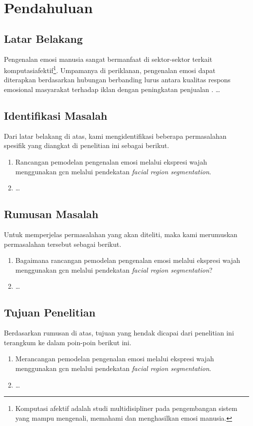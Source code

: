 \chapter{Pendahuluan}

\section{Latar Belakang}
Pengenalan emosi manusia sangat bermanfaat di sektor-sektor terkait \gls{komputasiafektif}\footnote{Komputasi afektif adalah studi multidisipliner pada pengembangan sistem yang mampu mengenali, memahami dan menghasilkan emosi manusia.}. Umpamanya di periklanan, pengenalan emosi dapat diterapkan berdasarkan hubungan berbanding lurus antara kualitas respons emosional masyarakat terhadap iklan dengan peningkatan penjualan . \dots

\section{Identifikasi Masalah}
Dari latar belakang di atas, kami mengidentifikasi beberapa permasalahan spesifik yang diangkat di penelitian ini sebagai berikut.
\begin{enumerate}
    \item Rancangan pemodelan pengenalan emosi melalui ekspresi wajah menggunakan \acrshort{gcn} melalui pendekatan \emph{facial region segmentation}.
    \item \dots
\end{enumerate}

\section{Rumusan Masalah}
Untuk memperjelas permasalahan yang akan diteliti, maka kami merumuskan permasalahan tersebut sebagai berikut.
\begin{enumerate}
    \item Bagaimana rancangan pemodelan pengenalan emosi melalui ekspresi wajah menggunakan \acrshort{gcn} melalui pendekatan \emph{facial region segmentation}?
    \item \dots
\end{enumerate}

\section{Tujuan Penelitian}
Berdasarkan rumusan di atas, tujuan yang hendak dicapai dari penelitian ini terangkum ke dalam poin-poin berikut ini.
\begin{enumerate}
    \item Merancangan pemodelan pengenalan emosi melalui ekspresi wajah menggunakan \acrshort{gcn} melalui pendekatan \emph{facial region segmentation}.
    \item \dots
\end{enumerate}

